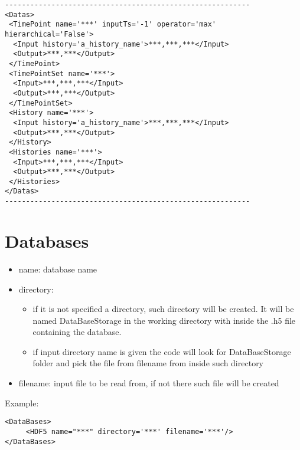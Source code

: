 \begin{lstlisting}[style=XML]
----------------------------------------------------------
<Datas> 
 <TimePoint name='***' inputTs='-1' operator='max' hierarchical='False'>  
  <Input history='a_history_name'>***,***,***</Input>
  <Output>***,***</Output>
 </TimePoint> 
 <TimePointSet name='***'>  
  <Input>***,***,***</Input>
  <Output>***,***</Output>
 </TimePointSet> 
 <History name='***'>  
  <Input history='a_history_name'>***,***,***</Input>
  <Output>***,***</Output>
 </History> 
 <Histories name='***'>  
  <Input>***,***,***</Input>
  <Output>***,***</Output>
 </Histories> 
</Datas>
----------------------------------------------------------
\end{lstlisting}

\section{Databases}
\label{sec:Databases}
\begin{itemize}
\item name: database name
\item directory:
\begin{itemize}
\item if it is not specified a directory, such directory will be created. It will be named DataBaseStorage in the working directory with inside the .h5 file containing the database. 
\item if input directory name is given the code will look for DataBaseStorage folder and pick the file from filename from inside such directory
\end{itemize}
\item filename: input file to be read from, if not there such file will be created

\end{itemize}
Example:
\begin{lstlisting}[style=XML]
<DataBases> 
     <HDF5 name="***" directory='***' filename='***'/>  
</DataBases>   
\end{lstlisting}

